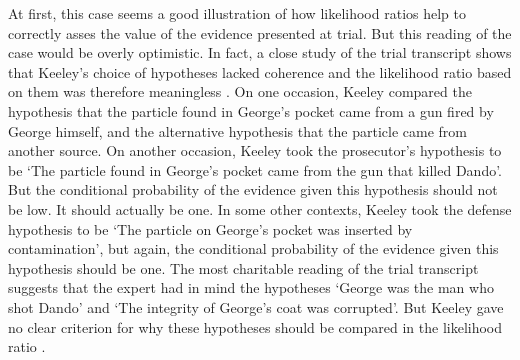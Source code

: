 \documentclass{article}
\begin{document}
At first, this case seems a good illustration of how likelihood ratios help to correctly asses the value of the evidence presented at trial. But this reading of the case would be overly optimistic. In fact, a close study of the trial transcript shows that Keeley's choice of hypotheses lacked coherence and the likelihood ratio based on them was therefore meaningless \citep{fenton2014WhenNeutralEvidence}. 
%
%
%
On one occasion, Keeley compared the hypothesis that the particle found in George's pocket came from a gun fired by George himself, and the alternative hypothesis that the particle came from another source. 
On another occasion, Keeley took the prosecutor's hypothesis to be `The particle found in George's pocket came from the gun that killed Dando'. 
But the  conditional probability of the evidence given this hypothesis should not be low. It should actually be one. 
%
In some other contexts, Keeley took the defense hypothesis to be `The particle on George's pocket was inserted by contamination', but again,  the conditional probability of the evidence given this hypothesis should be one. 
The most charitable reading of the trial transcript   suggests that the expert had in mind the hypotheses 
 `George was the man who shot Dando' and  `The integrity of George's coat was corrupted'. But 
Keeley gave no clear criterion  for why these hypotheses should be compared in the 
 likelihood ratio \citep[see][for further details]{fenton2014WhenNeutralEvidence}.
 
\end{document}
